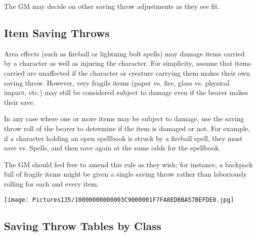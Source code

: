\documentclass[a4paper,twoside,openany,10pt]{book}
\begin{document}
\begin{multicols}{2}
The GM may decide on other saving throw adjustments as they see fit.

\subsection{Item Saving Throws}\label{item-saving-throws}

Area effects (such as fireball or lightning bolt spells) may damage items carried by a character as well as injuring the character. For simplicity, assume that items carried are unaffected if the character or creature carrying them makes their own saving throw. However, very fragile items (paper vs. fire, glass vs. physical impact, etc.) may still be considered subject to damage even if the bearer makes their save.

In any case where one or more items may be subject to damage, use the saving throw roll of the bearer to determine if the item is damaged or not. For example, if a character holding an open spellbook is struck by a fireball spell, they must save vs. Spells, and then save again at the same odds for the spellbook.

The GM should feel free to amend this rule as they wish; for instance, a backpack full of fragile items might be given a single saving throw rather than laboriously rolling for each and every item.

\end{multicols}

\vfill

\begin{center}
	\texttt{[image: Pictures135/10000000000003C9000001F7FA8EDBBA57BEFDE0.jpg]}
\end{center}

\pagebreak


\subsection{Saving Throw Tables by Class}\label{saving-throw-tables-by-class}
\end{document}
